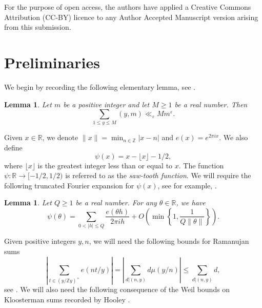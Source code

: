 \documentclass[12pt,reqno]{amsart}
\newtheorem{lemma}[theorem]{Lemma}
\theoremstyle{definition}
\theoremstyle{remark}
\numberwithin{equation}{section}
\renewcommand{\geq}{\geqslant}
\renewcommand{\leq}{\leqslant}
\def \R {\mathbb{R}}
\newcommand\1{\mathds{1}}
\begin{document}
For the purpose of open access, the authors have applied a Creative Commons Attribution (CC-BY) licence to any Author Accepted Manuscript version arising from this submission.

\section{Preliminaries} \label{sec2}



We begin by recording the following elementary lemma, see \cite[Lemma 2.3]{CM2025b}.

\begin{lemma} \label{lem2.1}
    Let $m$ be a positive integer and let $M \geq 1$ be a real number. Then 
    \[ \sum_{1 \leq y \leq M} (y,m) \ll_{\varepsilon} M m^{\varepsilon}. \]
\end{lemma}



Given $x \in \mathbb{R}$, we denote $\lVert x \rVert = \min_{n \in \mathbb{Z}} |x - n|$ and $e(x) = e^{2 \pi i x}$. We also define 
\begin{equation} \label{eqn2.1}
    \psi(x) = x - \lfloor x \rfloor - 1/2, 
\end{equation}
where $\lfloor x \rfloor$ is the  greatest integer less than or equal to $x$.   The function $\psi : \mathbb{R} \to [-1/2,1/2)$ is referred to as the \emph{saw-tooth function}. We will require the following truncated Fourier expansion for $\psi(x)$, see for example, \cite[\S5]{Hoo1963}.

\begin{lemma} \label{lem2.2}
    Let $Q \geqslant 1$ be a real number. For any $\theta\in\R$, we have
    \begin{equation*}
        \psi(\theta) = \sum_{0<|h|\leqslant Q}\frac{e(\theta h)}{2\pi i h} + O\left(\min\left\lbrace 1, \frac{1}{Q\lVert \theta\rVert}\right\rbrace\right).
    \end{equation*}
\end{lemma}


Given positive integers $y,n$, we will need the following bounds for Ramanujan sums
\begin{equation} \label{eqn2.2}
|\sum_{ t \in (y/\mathbb{Z}y)^{\times}} e(nt/y)| = |\sum_{d| (n,y)} d \mu(y/n)| \leq \sum_{d|(n,y)} d,
\end{equation}
see \cite[Theorem 8.6]{Ap1976}. We will also need the following consequence of the Weil bounds on Kloosterman sums recorded by Hooley \cite[Lemma 2]{Hoo1957}.
\end{document}
